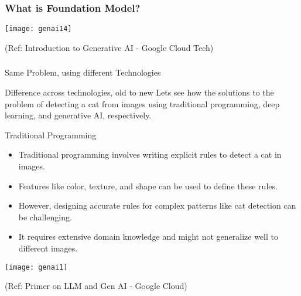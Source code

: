 \begin{frame}[fragile]\frametitle{What is Foundation Model?}

\begin{center}
\texttt{[image: genai14]}
\end{center}


{\tiny (Ref: Introduction to Generative AI - Google Cloud Tech)}

\end{frame}


\begin{frame}[fragile]\frametitle{}
\begin{center}
{\Large Same Problem, using different Technologies}
\end{center}
\end{frame}


\begin{frame}[fragile]{Difference across technologies, old to new}
Lets see how the solutions to the problem of detecting a cat from images using traditional programming, deep learning, and generative AI, respectively.
\end{frame}

\begin{frame}[fragile]{Traditional Programming}
  \begin{itemize}
    \item Traditional programming involves writing explicit rules to detect a cat in images.
    \item Features like color, texture, and shape can be used to define these rules.
    \item However, designing accurate rules for complex patterns like cat detection can be challenging.
    \item It requires extensive domain knowledge and might not generalize well to different images.
  \end{itemize}
  
\begin{center}
\texttt{[image: genai1]}
\end{center}

{\tiny (Ref: Primer on LLM and Gen AI - Google Cloud)}
  
\end{frame}

